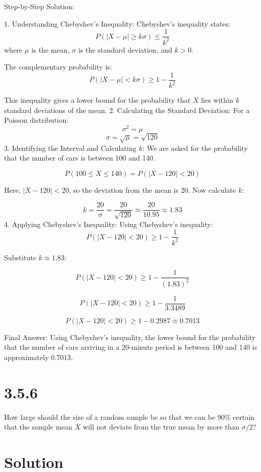 \documentclass{article}
\begin{document}
Step-by-Step Solution:
\newline

1. Understanding Chebyshev's Inequality:
Chebyshev's inequality states:
\[
P(|X - \mu| \geq k\sigma) \leq \frac{1}{k^2}
\]
where \(\mu\) is the mean, \(\sigma\) is the standard deviation, and \(k > 0\).

The complementary probability is:
\[
P(|X - \mu| < k\sigma) \geq 1 - \frac{1}{k^2}
\]

This inequality gives a lower bound for the probability that \(X\) lies within \(k\) standard deviations of the mean.
2. Calculating the Standard Deviation:
For a Poisson distribution:
\[
\sigma^2 = \mu
\]
\[
\sigma = \sqrt{\mu} = \sqrt{120}
\]
3. Identifying the Interval and Calculating \(k\):
We are asked for the probability that the number of cars is between 100 and 140.

\[
P(100 \leq X \leq 140) = P(|X - 120| < 20)
\]

Here, \(|X - 120| < 20\), so the deviation from the mean is 20. Now calculate \(k\):

\[
k = \frac{20}{\sigma} = \frac{20}{\sqrt{120}} \approx \frac{20}{10.95} \approx 1.83
\]
4. Applying Chebyshev's Inequality:
Using Chebyshev's inequality:
\[
P(|X - 120| < 20) \geq 1 - \frac{1}{k^2}
\]

Substitute \(k \approx 1.83\):

\[
P(|X - 120| < 20) \geq 1 - \frac{1}{(1.83)^2}
\]

\[
P(|X - 120| < 20) \geq 1 - \frac{1}{3.3489}
\]

\[
P(|X - 120| < 20) \geq 1 - 0.2987 \approx 0.7013
\]

Final Answer:
Using Chebyshev's inequality, the lower bound for the probability that the number of cars arriving in a 20-minute period is between 100 and 140 is approximately \(0.7013\).

\section*{3.5.6}

How large should the size of a random sample be so that we can be 90\% certain that the sample mean \(\overline{X}\) will not deviate from the true mean by more than \(\sigma/2\)?


\section*{Solution}
\end{document}
